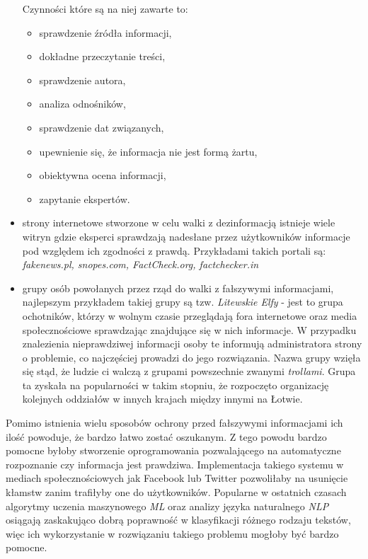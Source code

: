 \begin{itemize}
    Czynności które są na niej zawarte to: 
    \begin{itemize}
        \item sprawdzenie źródła informacji,
        \item dokładne przeczytanie treści,
        \item sprawdzenie autora,
        \item analiza odnośników,
        \item sprawdzenie dat związanych,
        \item upewnienie się, że informacja nie jest formą żartu,
        \item obiektywna ocena informacji,
        \item zapytanie ekspertów.
    \end{itemize}
    \item strony internetowe stworzone w celu walki z dezinformacją istnieje
    wiele witryn gdzie eksperci sprawdzają nadesłane przez użytkowników informacje
    pod względem ich zgodności z prawdą.
    Przykładami takich portali są: \emph{fakenews.pl, snopes.com, FactCheck.org, factchecker.in} 
    \item grupy osób powołanych przez rząd do walki z fałszywymi informacjami, najlepszym przykładem
    takiej grupy są tzw. \emph{Litewskie Elfy} - jest to grupa ochotników, którzy w wolnym czasie przeglądają 
    fora internetowe oraz media społecznościowe sprawdzając znajdujące się w nich informacje. W przypadku
    znalezienia nieprawdziwej informacji osoby te informują administratora strony o problemie, co najczęściej
    prowadzi do jego rozwiązania. Nazwa grupy wzięła się stąd, że ludzie ci walczą z 
    grupami powszechnie zwanymi \emph{trollami}. Grupa ta zyskała na popularności
    w takim stopniu, że rozpoczęto organizację kolejnych oddziałów w innych krajach
    między innymi na Łotwie.~\cite{Elves}
\end{itemize}
Pomimo istnienia wielu sposobów ochrony przed fałszywymi informacjami ich ilość powoduje,
że bardzo łatwo zostać oszukanym. Z tego powodu bardzo pomocne byłoby stworzenie oprogramowania
pozwalającego na automatyczne rozpoznanie czy informacja jest prawdziwa.
Implementacja takiego systemu w mediach społecznościowych jak Facebook lub Twitter pozwoliłaby na usunięcie 
kłamstw zanim trafiłyby one do użytkowników. Popularne w ostatnich czasach algorytmy uczenia
maszynowego \emph{ML} oraz analizy języka naturalnego \emph{NLP} osiągają zaskakująco dobrą 
poprawność w klasyfikacji różnego rodzaju tekstów, więc ich wykorzystanie w rozwiązaniu takiego 
problemu mogłoby być bardzo pomocne.

